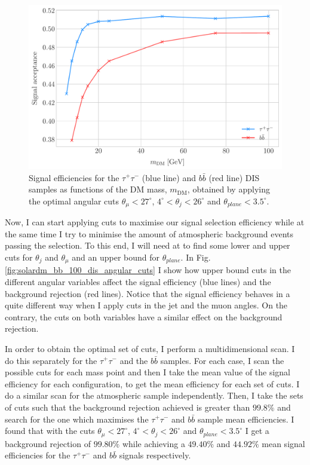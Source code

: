 \begin{figure}[t]
	\centering
	\includegraphics[width=0.9\linewidth]{Images/DM_Analysis/solardm_dis_signal_acceptance.pdf}
	\caption[Signal efficiencies for the $\tau^{+} \tau^{-}$ and $b\bar{b}$ DIS samples as functions of the DM mass.]{Signal efficiencies for the $\tau^{+} \tau^{-}$ (blue line) and $b\bar{b}$ (red line) DIS samples as functions of the DM mass, $m_{\mathrm{DM}}$, obtained by applying the optimal angular cuts $\theta_{\mu} < 27^{\circ}$, $4^{\circ} < \theta_{j} < 26^{\circ}$ and $\theta_{plane} < 3.5^{\circ}$.}
	\label{fig:solardm_dis_efficiency}
\end{figure}

Now, I can start applying cuts to maximise our signal selection efficiency while at the same time I try to minimise the amount of atmospheric background events passing the selection. To this end, I will need at to find some lower and upper cuts for $\theta_{j}$ and $\theta_{\mu}$ and an upper bound for $\theta_{plane}$. In Fig. \ref{fig:solardm_bb_100_dis_angular_cuts} I show how upper bound cuts in the different angular variables affect the signal efficiency (blue lines) and the background rejection (red lines). Notice that the signal efficiency behaves in a quite different way when I apply cuts in the jet and the muon angles. On the contrary, the cuts on both variables have a similar effect on the background rejection.

In order to obtain the optimal set of cuts, I perform a multidimensional scan. I do this separately for the $\tau^{+} \tau^{-}$ and the $b\bar{b}$ samples. For each case, I scan the possible cuts for each mass point and then I take the mean value of the signal efficiency for each configuration, to get the mean efficiency for each set of cuts. I do a similar scan for the atmospheric sample independently. Then, I take the sets of cuts such that the background rejection achieved is greater than $99.8\%$ and search for the one which maximises the $\tau^{+} \tau^{-}$ and $b\bar{b}$ sample mean efficiencies. I found that with the cuts $\theta_{\mu} < 27^{\circ}$, $4^{\circ} < \theta_{j} < 26^{\circ}$ and $\theta_{plane} < 3.5^{\circ}$ I get a background rejection of $99.80\%$ while achieving a $49.40\%$ and $44.92\%$ mean signal efficiencies for the $\tau^{+} \tau^{-}$ and $b\bar{b}$ signals respectively.

